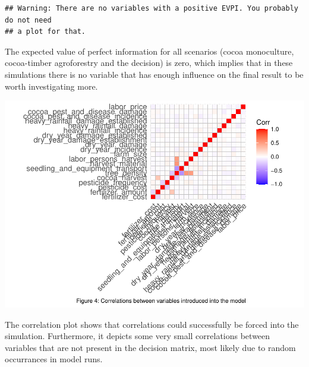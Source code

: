 \documentclass[
]{article}
\begin{document}
\begin{verbatim}
## Warning: There are no variables with a positive EVPI. You probably do not need
## a plot for that.
\end{verbatim}

The expected value of perfect information for all scenarios (cocoa
monoculture, cocoa-timber agroforestry and the decision) is zero, which
implies that in these simulations there is no variable that has enough
influence on the final result to be worth investigating more.

\includegraphics{Report_files/figure-latex/correlation-1.pdf}

The correlation plot shows that correlations could successfully be
forced into the simulation. Furthermore, it depicts some very small
correlations between variables that are not present in the decision
matrix, most likely due to random occurrances in model runs.
\end{document}
